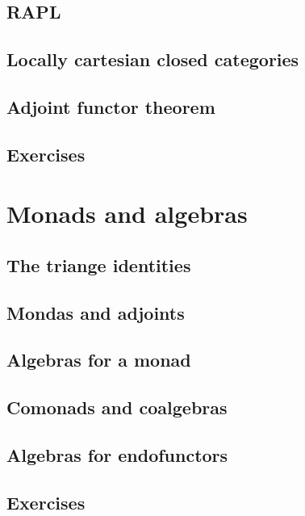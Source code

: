 \documentclass[uplatex, 12pt, dvipdfmx]{jsarticle}
\begin{document}
\subsection{RAPL}

\subsection{Locally cartesian closed categories}

\subsection{Adjoint functor theorem}

\subsection{Exercises}

\section{Monads and algebras}

\subsection{The triange identities}

\subsection{Mondas and adjoints}

\subsection{Algebras for a monad}

\subsection{Comonads and coalgebras}

\subsection{Algebras for endofunctors}

\subsection{Exercises}
\end{document}
